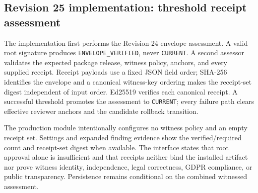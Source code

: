 

\subsection{Revision 25 implementation: threshold receipt assessment}

The implementation first performs the Revision-24 envelope assessment. A valid root signature produces \texttt{ENVELOPE\_VERIFIED}, never \texttt{CURRENT}. A second assessor validates the expected package release, witness policy, anchors, and every supplied receipt. Receipt payloads use a fixed JSON field order; SHA-256 identifies the envelope and a canonical witness-key ordering makes the receipt-set digest independent of input order. Ed25519 verifies each canonical receipt. A successful threshold promotes the assessment to \texttt{CURRENT}; every failure path clears effective reviewer anchors and the candidate rollback transition.

The production module intentionally configures no witness policy and an empty receipt set. Settings and expanded finding evidence show the verified/required count and receipt-set digest when available. The interface states that root approval alone is insufficient and that receipts neither bind the installed artifact nor prove witness identity, independence, legal correctness, GDPR compliance, or public transparency. Persistence remains conditional on the combined witnessed assessment.
